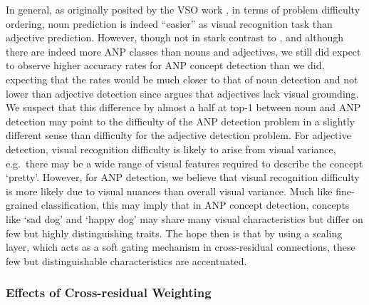 \documentclass{sig-alternate-05-2015}
\begin{document}
In general, as originally posited by the VSO work \cite{borth_2013}, in terms of problem difficulty ordering, noun prediction is indeed ``easier'' as visual recognition task than adjective prediction.
However, though not in stark contrast to \cite{borth_2013}, and although there are indeed more ANP classes than nouns and adjectives, we still did expect to observe higher accuracy rates for ANP concept detection than we did, expecting that the rates would be much closer to that of noun detection and not lower than adjective detection since \cite{borth_2013} argues that adjectives lack visual grounding.
We suspect that this difference by almost a half at top-1 between noun and ANP detection may point to the difficulty of the ANP detection problem in a slightly different sense than difficulty for the adjective detection problem.
For adjective detection, visual recognition difficulty is likely to arise from visual variance, e.g.~there may be a wide range of visual features required to describe the concept `pretty'.
However, for ANP detection, we believe that visual recognition difficulty is more likely due to visual nuances than overall visual variance.
Much like fine-grained classification, this may imply that in ANP concept detection, concepts like `sad dog' and `happy dog' may share many visual characteristics but differ on few but highly distinguishing traits.
The hope then is that by using a scaling layer, which acts as a soft gating mechanism in cross-residual connections, these few but distinguishable characteristics are accentuated.

\subsubsection{Effects of Cross-residual Weighting}
\end{document}

